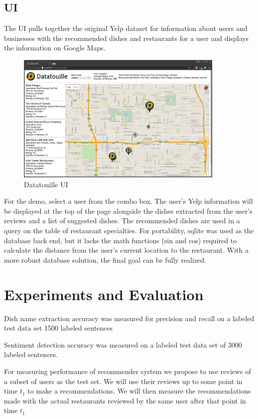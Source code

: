 \documentclass[twoside,12pt]{article}
\begin{document}
\subsection{UI}
The UI pulls together the original Yelp dataset for information about users and businesses with the recommended dishes and restaurants for a user and displays the information on Google Maps. 

\begin{figure}[hb]
	\centering
	\includegraphics[width=100mm]{screenshot.png}
    \caption{Datatouille UI}
\end{figure}

For the demo, select a user from the combo box. The user's Yelp information will be displayed at the top of the page alongside the dishes extracted from the user's reviews and a list of suggested dishes. The recommended dishes are used in a query on the table of restaurant specialties. For portability, sqlite was used as the database back end, but it lacks the math functions (sin and cos) required to calculate the distance from the user's current location to the restaurant. With a more robust database solution, the final goal can be fully realized. 

\section{Experiments and Evaluation}
\label{Experiments and Evaluation}
Dish name extraction accuracy was measured for precision and recall on a labeled test data set  1500 labeled sentences
\newline

Sentiment detection accuracy was measured on a labeled test data set of 3000 labeled sentences.
\newline

For measuring performance of recommender system we propose to use reviews of a subset of users as the test set. We will use their reviews up to some point in time $t_1$ to make a recommendations. We will then measure the recommendations made with the actual restaurants reviewed by the same user after that point in time $t_1$
\newline
\end{document}
